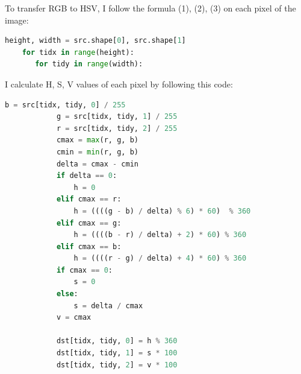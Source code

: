 \documentclass{article}
\begin{document}
To transfer RGB to HSV, I follow the formula (1), (2), (3) on each pixel of the image:
\begin{lstlisting}[language=Python]
    height, width = src.shape[0], src.shape[1]
    for tidx in range(height):
       for tidy in range(width):
\end{lstlisting}
I calculate H, S, V values of each pixel by following this code:
\begin{lstlisting}[language=Python]
            b = src[tidx, tidy, 0] / 255
            g = src[tidx, tidy, 1] / 255
            r = src[tidx, tidy, 2] / 255
            cmax = max(r, g, b)
            cmin = min(r, g, b)
            delta = cmax - cmin
            if delta == 0:
                h = 0
            elif cmax == r:
                h = ((((g - b) / delta) % 6) * 60)  % 360
            elif cmax == g:
                h = ((((b - r) / delta) + 2) * 60) % 360
            elif cmax == b:
                h = ((((r - g) / delta) + 4) * 60) % 360
            if cmax == 0:
                s = 0
            else:
                s = delta / cmax
            v = cmax

            dst[tidx, tidy, 0] = h % 360
            dst[tidx, tidy, 1] = s * 100
            dst[tidx, tidy, 2] = v * 100
\end{lstlisting}
\end{document}
